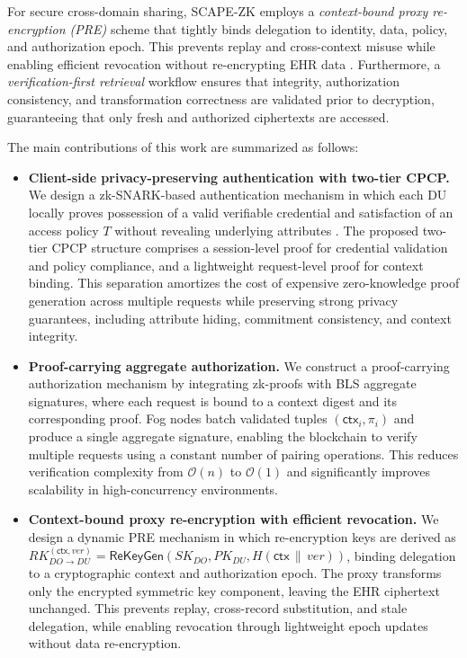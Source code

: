\documentclass[conference]{IEEEtran}
\begin{document}
For secure cross-domain sharing, SCAPE-ZK employs a \emph{context-bound proxy re-encryption (PRE)} scheme that tightly binds delegation to identity, data, policy, and authorization epoch. This prevents replay and cross-context misuse while enabling efficient revocation without re-encrypting EHR data \cite{b12}. Furthermore, a \emph{verification-first retrieval} workflow ensures that integrity, authorization consistency, and transformation correctness are validated prior to decryption, guaranteeing that only fresh and authorized ciphertexts are accessed.

The main contributions of this work are summarized as follows:

\begin{itemize}

\item \textbf{Client-side privacy-preserving authentication with two-tier CPCP.}  
We design a zk-SNARK-based authentication mechanism in which each DU locally proves possession of a valid verifiable credential and satisfaction of an access policy $T$ without revealing underlying attributes \cite{b8,b9}. The proposed two-tier CPCP structure comprises a session-level proof for credential validation and policy compliance, and a lightweight request-level proof for context binding. This separation amortizes the cost of expensive zero-knowledge proof generation across multiple requests while preserving strong privacy guarantees, including attribute hiding, commitment consistency, and context integrity.

\item \textbf{Proof-carrying aggregate authorization.}  
We construct a proof-carrying authorization mechanism by integrating zk-proofs with BLS aggregate signatures, where each request is bound to a context digest and its corresponding proof. Fog nodes batch validated tuples $(\mathsf{ctx}_i,\pi_i)$ and produce a single aggregate signature, enabling the blockchain to verify multiple requests using a constant number of pairing operations. This reduces verification complexity from $\mathcal{O}(n)$ to $\mathcal{O}(1)$ and significantly improves scalability in high-concurrency environments.

\item \textbf{Context-bound proxy re-encryption with efficient revocation.}  
We design a dynamic PRE mechanism in which re-encryption keys are derived as $RK_{DO\rightarrow DU}^{(\mathsf{ctx},ver)}=\textsf{ReKeyGen}(SK_{DO},PK_{DU},H(\mathsf{ctx}\,\|\,ver))$, binding delegation to a cryptographic context and authorization epoch. The proxy transforms only the encrypted symmetric key component, leaving the EHR ciphertext unchanged. This prevents replay, cross-record substitution, and stale delegation, while enabling revocation through lightweight epoch updates without data re-encryption.


\end{itemize}
\end{document}
